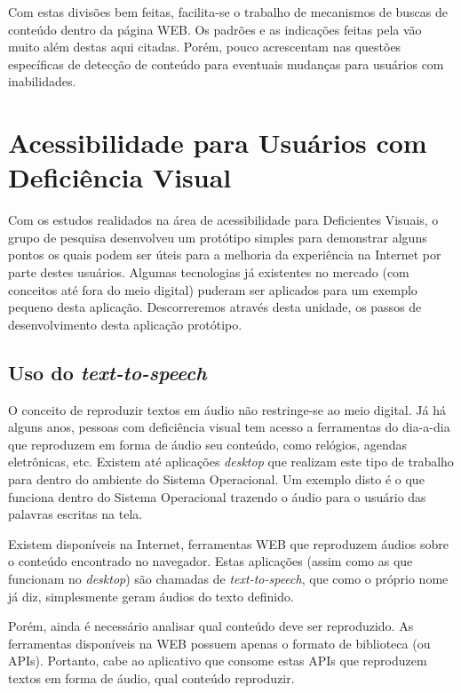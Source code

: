\documentclass[
	12pt,				%
	oneside,			%
	a4paper,			%
	english,			%
	brazil				%
	]{abntex2ppgsi}
\begin{document}
Com estas divisões bem feitas, facilita-se o trabalho de mecanismos de buscas de conteúdo dentro da página WEB. Os padrões e as indicações feitas pela  vão muito além destas aqui citadas. Porém, pouco acrescentam nas questões específicas de detecção de conteúdo para eventuais mudanças para usuários com inabilidades.

\chapter{Acessibilidade para Usuários com Deficiência Visual} \label{appCegos}

Com os estudos realidados na área de acessibilidade para Deficientes Visuais, o grupo de pesquisa desenvolveu um protótipo simples para demonstrar alguns pontos os quais podem ser úteis para a melhoria da experiência na Internet por parte destes usuários. Algumas tecnologias já existentes no mercado (com conceitos até fora do meio digital) puderam ser aplicados para um exemplo pequeno desta aplicação. Descorreremos através desta unidade, os passos de desenvolvimento desta aplicação protótipo.

\section{Uso do \textit{text-to-speech}}

O conceito de reproduzir textos em áudio não restringe-se ao meio digital. Já há alguns anos, pessoas com deficiência visual tem acesso a ferramentas do dia-a-dia que reproduzem em forma de áudio seu conteúdo, como relógios, agendas eletrônicas, etc. Existem até aplicações \textit{desktop} que realizam este tipo de trabalho para dentro do ambiente do Sistema Operacional. Um exemplo disto é o  que funciona dentro do Sistema Operacional trazendo o áudio para o usuário das palavras escritas na tela. 

Existem disponíveis na Internet, ferramentas WEB que reproduzem áudios sobre o conteúdo encontrado no navegador. Estas aplicações (assim como as que funcionam no \textit{desktop}) são chamadas de \textit{text-to-speech}, que como o próprio nome já diz, simplesmente geram áudios do texto definido.

Porém, ainda é necessário analisar qual conteúdo deve ser reproduzido. As ferramentas disponíveis na WEB possuem apenas o formato de biblioteca (ou APIs). Portanto, cabe ao aplicativo que consome estas APIs que reproduzem textos em forma de áudio, qual conteúdo reproduzir.
\end{document}
